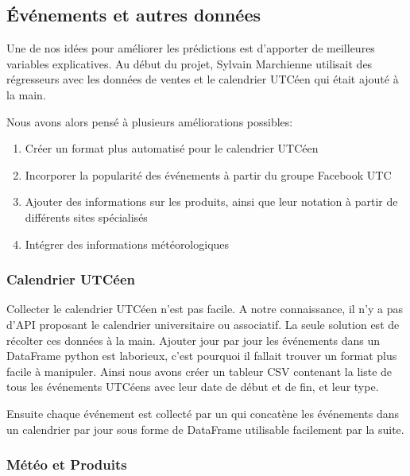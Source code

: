 

\subsection{Événements et autres données}
\label{subsec:data_event}

Une de nos idées pour améliorer les prédictions est d'apporter de meilleures variables explicatives. Au début du projet, Sylvain Marchienne utilisait des régresseurs avec les données de ventes et le calendrier UTCéen qui était ajouté à la main.

Nous avons alors pensé à plusieurs améliorations possibles:
\begin{enumerate}[nolistsep]
    \item Créer un format plus automatisé pour le calendrier UTCéen
    \item Incorporer la popularité des événements à partir du groupe Facebook UTC
    \item Ajouter des informations sur les produits, ainsi que leur notation à partir de différents sites spécialisés
    \item Intégrer des informations météorologiques
\end{enumerate}

\subsubsection{Calendrier UTCéen}
\label{subsec:calendar}

Collecter le calendrier UTCéen n'est pas facile. A notre connaissance, il n'y a pas d'API proposant le calendrier universitaire ou associatif. La seule solution est de récolter ces données à la main. Ajouter jour par jour les événements dans un DataFrame python est laborieux, c'est pourquoi il fallait trouver un format plus facile à manipuler. Ainsi nous avons créer un tableur CSV contenant la liste de tous les événements UTCéens avec leur date de début et de fin, et leur type.

Ensuite chaque événement est collecté par un  qui concatène les événements dans un calendrier par jour sous forme de DataFrame utilisable facilement par la suite.

\subsubsection{Météo et Produits}
\label{subsec:meteo_products}

